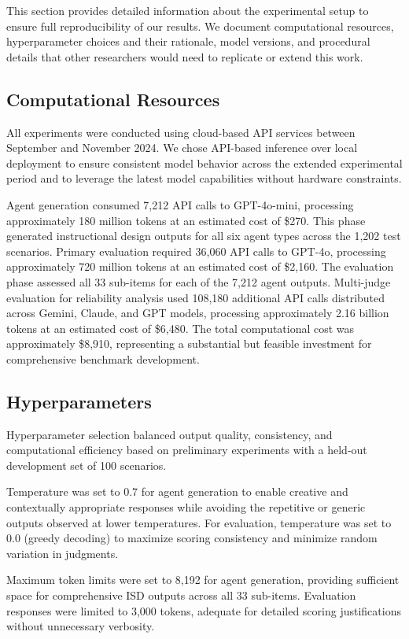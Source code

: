 This section provides detailed information about the experimental setup to ensure full reproducibility of our results. We document computational resources, hyperparameter choices and their rationale, model versions, and procedural details that other researchers would need to replicate or extend this work.

\subsection{Computational Resources}

All experiments were conducted using cloud-based API services between September and November 2024. We chose API-based inference over local deployment to ensure consistent model behavior across the extended experimental period and to leverage the latest model capabilities without hardware constraints.

Agent generation consumed 7,212 API calls to GPT-4o-mini, processing approximately 180 million tokens at an estimated cost of \$270. This phase generated instructional design outputs for all six agent types across the 1,202 test scenarios. Primary evaluation required 36,060 API calls to GPT-4o, processing approximately 720 million tokens at an estimated cost of \$2,160. The evaluation phase assessed all 33 sub-items for each of the 7,212 agent outputs. Multi-judge evaluation for reliability analysis used 108,180 additional API calls distributed across Gemini, Claude, and GPT models, processing approximately 2.16 billion tokens at an estimated cost of \$6,480. The total computational cost was approximately \$8,910, representing a substantial but feasible investment for comprehensive benchmark development.

\subsection{Hyperparameters}

Hyperparameter selection balanced output quality, consistency, and computational efficiency based on preliminary experiments with a held-out development set of 100 scenarios.

Temperature was set to 0.7 for agent generation to enable creative and contextually appropriate responses while avoiding the repetitive or generic outputs observed at lower temperatures. For evaluation, temperature was set to 0.0 (greedy decoding) to maximize scoring consistency and minimize random variation in judgments.

Maximum token limits were set to 8,192 for agent generation, providing sufficient space for comprehensive ISD outputs across all 33 sub-items. Evaluation responses were limited to 3,000 tokens, adequate for detailed scoring justifications without unnecessary verbosity.

